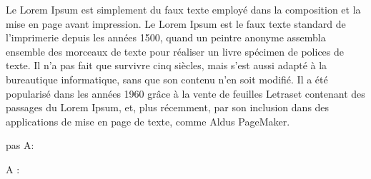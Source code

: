\documentclass{article}
\begin{document}
\renewcommand{\showlemma}[1]{\emph{#1}}
\beginnumbering
\pstart
Le Lorem Ipsum est simplement du faux texte employé dans la  composition et la mise en page avant impression. Le Lorem Ipsum est le faux texte standard de l'imprimerie depuis les années 1500, quand un peintre anonyme assembla ensemble des morceaux de texte pour réaliser un livre spécimen de polices de texte. Il n'a pas fait que survivre cinq siècles, mais s'est aussi adapté à la bureautique informatique, sans que son contenu n'en soit modifié. Il a été popularisé dans les années 1960 grâce à la vente de feuilles Letraset contenant des passages du Lorem Ipsum, et, plus récemment, par son inclusion dans des applications de mise en page de texte, comme Aldus PageMaker.
\pend
\endnumbering

pas A:

A :
\end{document}
